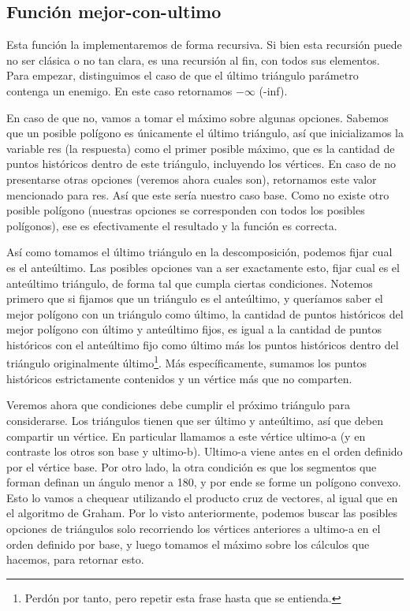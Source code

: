 \subsection{Función mejor-con-ultimo}
\par{Esta función la implementaremos de forma recursiva. Si bien esta recursión puede no ser clásica o no tan clara, es una recursión al fin, con todos sus elementos.
Para empezar, distinguimos el caso de que el último triángulo parámetro contenga un enemigo. En este caso retornamos $-\infty$ (-inf). } \newline
\par{En caso de que no, vamos a tomar el máximo sobre algunas opciones. Sabemos que un posible polígono es únicamente el último triángulo, así que inicializamos la variable res (la respuesta) como el primer posible máximo, que es la cantidad de puntos históricos dentro de este triángulo, incluyendo los vértices.
En caso de no presentarse otras opciones (veremos ahora cuales son), retornamos este valor mencionado para res. Así que este sería nuestro caso base. Como no existe otro posible polígono (nuestras opciones se corresponden con todos los posibles polígonos), ese es efectivamente el resultado y la función es correcta.} \newline
\par{
Así como tomamos el último triángulo en la descomposición, podemos fijar cual es el anteúltimo.
Las posibles opciones van a ser exactamente esto, fijar cual es el anteúltimo triángulo, de forma tal que cumpla ciertas condiciones.
Notemos primero que si fijamos que un triángulo es el anteúltimo, y queríamos saber el mejor polígono con un triángulo como último, la cantidad de puntos históricos del mejor polígono con último y anteúltimo fijos, es igual a la cantidad de puntos históricos con el anteúltimo fijo como último más los puntos históricos dentro del triángulo originalmente último\footnote{Perdón por tanto, pero repetir esta frase hasta que se entienda.}. Más específicamente, sumamos los puntos históricos estrictamente contenidos y un vértice más que no comparten.
} \newline
\par{Veremos ahora que condiciones debe cumplir el próximo triángulo para considerarse. Los triángulos tienen que ser último y anteúltimo, así que deben compartir un vértice. En particular llamamos a este vértice ultimo-a (y en contraste los otros son base y ultimo-b). Ultimo-a viene antes en el orden definido por el vértice base. Por otro lado, la otra condición es que los segmentos que forman definan un ángulo menor a 180, y por ende se forme un polígono convexo. Esto lo vamos a chequear utilizando el producto cruz de vectores, al igual que en el algoritmo de Graham. 
Por lo visto anteriormente, podemos buscar las posibles opciones de triángulos solo recorriendo los vértices anteriores a ultimo-a en el orden definido por base, y luego tomamos el máximo sobre los cálculos que hacemos, para retornar esto.} \newline
 
